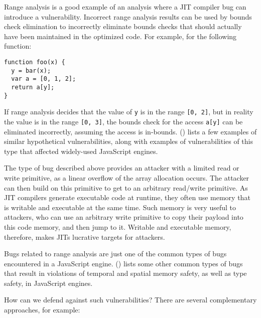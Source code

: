 \documentclass[
  a4paper,
]{report}
\begin{document}
Range analysis is a good example of an analysis where a JIT compiler bug
can introduce a vulnerability. Incorrect range analysis results can be
used by bounds check elimination to incorrectly eliminate bounds checks
that should actually have been maintained in the optimized code. For
example, for the following function:

\begin{verbatim}
function foo(x) {
  y = bar(x);
  var a = [0, 1, 2];
  return a[y];
}
\end{verbatim}

If range analysis decides that the value of \texttt{y} is in the range
\texttt{{[}0,\ 2{]}}, but in reality the value is in the range
\texttt{{[}0,\ 3{]}}, the bounds check for the access \texttt{a{[}y{]}}
can be eliminated incorrectly, assuming the access is in-bounds.
() lists a few examples of
similar hypothetical vulnerabilities, along with examples of
vulnerabilities of this type that affected widely-used JavaScript
engines.

The type of bug described above provides an attacker with a limited read
or write primitive, as a linear overflow of the array allocation occurs.
The attacker can then build on this primitive to get to an arbitrary
read/write primitive. As JIT compilers generate executable code at
runtime, they often use memory that is writable and executable at the
same time. Such memory is very useful to attackers, who can use an
arbitrary write primitive to copy their payload into this code memory,
and then jump to it. Writable and executable memory, therefore, makes
JITs lucrative targets for attackers.

Bugs related to range analysis are just one of the common types of bugs
encountered in a JavaScript engine. () lists some other common types of bugs that result in
violations of temporal and spatial memory safety, as well as type
safety, in JavaScript engines.

How can we defend against such vulnerabilities? There are several
complementary approaches, for example:
\end{document}
